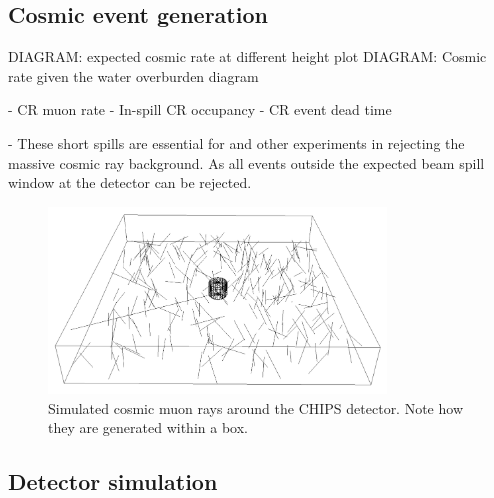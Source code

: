 \subsection{Cosmic event generation} %
\label{sec:chips_monte_carlo_cosmic} %

DIAGRAM: expected cosmic rate at different height plot
DIAGRAM: Cosmic rate given the water overburden diagram

- CR muon rate
- In-spill CR occupancy
- CR event dead time

- These short spills are essential for \chips and other experiments in rejecting the massive
cosmic ray background. As all events outside the expected beam spill window at the detector can be
rejected.

\begin{figure} %
    \includegraphics[width=0.8\textwidth]{diagrams/4-chips/cosmics.png}
    \caption[Cosmic muon rays around the CHIPS detector]
    {Simulated cosmic muon rays around the CHIPS detector. Note how they are generated within a
        box.}
    \label{fig:cosmics}
\end{figure}

\subsection{Detector simulation} %
\label{sec:chips_monte_carlo_sim} %

